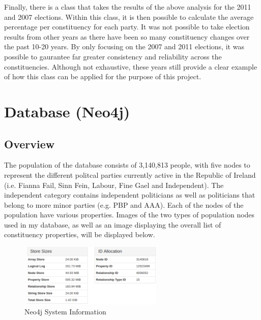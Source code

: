 Finally, there is a class that takes the results of the above analysis for the 2011 and 2007 elections. Within this class, it is then possible to calculate the average percentage per constituency for each party. It was not possible to take election results from other years as there have been so many constituency changes over the past 10-20 years. By only focusing on the 2007 and 2011 elections, it was possible to gaurantee far greater consistency and reliability across the constituencies.  Although not exhaustive, these years still provide a clear example of how this class can be applied for the purpose of this project. 
\section{Database (Neo4j)}
\subsection{Overview}
The population of the database consists of 3,140,813 people, with five nodes to represent the different politcal parties currently active in the Republic of Ireland (i.e. Fianna Fail, Sinn Fein, Labour, Fine Gael and Independent). The independent category contains independent politicians as well as politicians that belong to more minor parties (e.g. PBP and AAA). Each of the nodes of the population have various properties. Images of the two types of population nodes used in my database, as well as an image displaying the overall list of constituency properties, will be displayed below.
	\begin{figure}[h]
		\caption{Neo4j System Information}
		\centering
		\includegraphics[width=7cm, height=3cm]{img/neo4j-monitor}
	\end{figure}
\pagebreak

